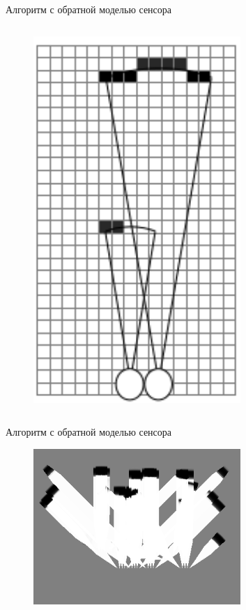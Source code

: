 \documentclass[9pt]{beamer}
\begin{document}
\begin{frame}{Алгоритм с обратной моделью сенсора}
\begin{columns}
\begin{column}{0.33\textwidth}
\begin{figure}[h]
    \includegraphics[width=0.7\textwidth]{inv3.png}
  \end{figure}
\end{column}
\end{columns}
\end{frame}

\begin{frame}{Алгоритм с обратной моделью сенсора}
\begin{figure}[h]
    \centering
    \includegraphics[width=0.7\textwidth]{inv_ex.png}
  \end{figure}
\end{frame}
\end{document}
